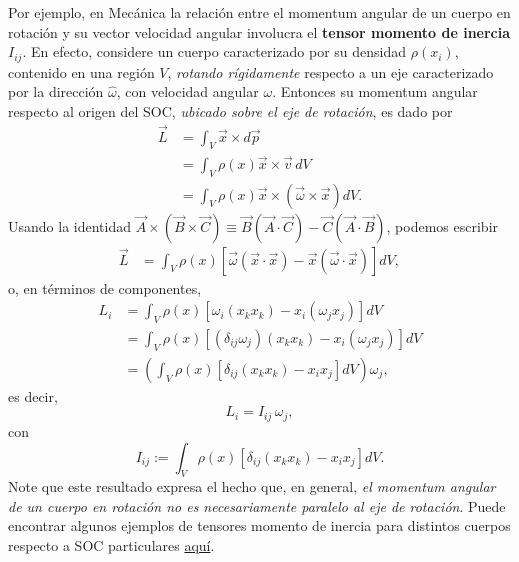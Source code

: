 Por ejemplo, en Mecánica la relación entre el momentum angular de un cuerpo en rotación y su vector velocidad angular involucra el \textbf{tensor momento de inercia} $I_{ij}$. En efecto, considere un cuerpo caracterizado por su densidad $\rho(x_i)$, contenido en una región $V$, \textit{rotando rígidamente} respecto a un eje caracterizado por la dirección $\hat{\omega}$, con velocidad angular $\omega$. Entonces su momentum angular respecto al origen del SOC, \textit{ubicado sobre el eje de rotación}, es dado por
\begin{align}
\vec{L} &= \int_V\vec{x}\times d\vec{p}\\
&= \int_V\rho(x)\vec{x}\times \vec{v}\,dV\\
&= \int_V\rho(x)\vec{x}\times \left(\vec{\omega}\times\vec{x}\right) dV.
\end{align}
Usando la identidad $\vec{A}\times (\vec{B}\times\vec{C})\equiv \vec{B}(\vec{A}\cdot\vec{C})-\vec{C}(\vec{A}\cdot\vec{B})$, podemos escribir
\begin{align}
\vec{L} &= \int_V\rho(x)\left[\vec{\omega}(\vec{x}\cdot\vec{x})-\vec{x}(\vec{\omega}\cdot\vec{x})\right] dV ,
\end{align}
o, en términos de componentes,
\begin{align}
L_i &= \int_V\rho(x)\left[\omega_i(x_kx_k)-x_i(\omega_j x_j)\right]dV  \\
&= \int_V\rho(x)\left[(\delta_{ij}\omega_j)(x_kx_k)-x_i(\omega_j x_j)\right]dV  \\
&= \left(\int_V\rho(x)\left[\delta_{ij}(x_kx_k)-x_i x_j\right]dV \right) \omega_j ,
\end{align}
es decir,
\begin{equation}\label{LIo}
\boxed{L_i=I_{ij}\,\omega_j,}
\end{equation}
con 
\begin{equation}
\boxed{I_{ij}:=\int_V\rho(x)\left[\delta_{ij}(x_kx_k)-x_i x_j\right]dV .}
\end{equation}
Note que este resultado expresa el hecho que, en general, \textit{el momentum angular de un cuerpo en rotación no es necesariamente paralelo al eje de rotación}. Puede encontrar algunos ejemplos de tensores momento de inercia para distintos cuerpos respecto a SOC particulares \href{http://en.wikipedia.org/wiki/List_of_moment_of_inertia_tensors}{aquí}.

